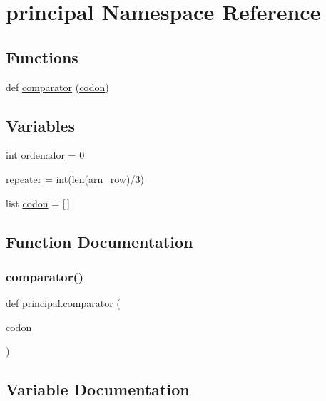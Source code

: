 \hypertarget{namespaceprincipal}{}\section{principal Namespace Reference}
\label{namespaceprincipal}
\subsection*{Functions}
\begin{DoxyCompactItemize}
\item 
def \hyperlink{namespaceprincipal_a2b2f660b32e0fa6854d9731de99fada3}{comparator} (\hyperlink{namespaceprincipal_afb4f3869e637b2b01f8257ee5b7d1de5}{codon})
\end{DoxyCompactItemize}
\subsection*{Variables}
\begin{DoxyCompactItemize}
\item 
int \hyperlink{namespaceprincipal_a4b41826d1c2ffe468473177ebc478e46}{ordenador} = 0
\item 
\hyperlink{namespaceprincipal_ab4deacbc988b017253215a98a73a73fb}{repeater} = int(len(arn\+\_\+row)/3)
\item 
list \hyperlink{namespaceprincipal_afb4f3869e637b2b01f8257ee5b7d1de5}{codon} = \mbox{[}$\,$\mbox{]}
\end{DoxyCompactItemize}


\subsection{Function Documentation}
\mbox{\label{namespaceprincipal_a2b2f660b32e0fa6854d9731de99fada3}} 
\subsubsection{\texorpdfstring{comparator()}{comparator()}}
{\footnotesize\ttfamily def principal.\+comparator (\begin{DoxyParamCaption}\item[{}]{codon }\end{DoxyParamCaption})}



\subsection{Variable Documentation}
\mbox{\label{namespaceprincipal_afb4f3869e637b2b01f8257ee5b7d1de5}} 
